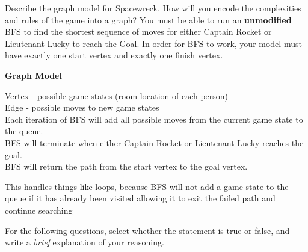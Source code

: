 \documentclass[12pt]{exam}
\newcommand{\stars}[1]{%
    \foreach \n in {1,...,#1}{%
        $\filledstar$%
    }%
}
\begin{document}
\begin{questions}

    \question[35] [Maze, \stars{5}] Describe the graph model for Spacewreck. How will you encode the complexities and rules of the game into a graph? You must be able to run an \textbf{unmodified} BFS to find the shortest sequence of moves for either Captain Rocket or Lieutenant Lucky to reach the Goal. In order for BFS to work, your model must have exactly one start vertex and exactly one finish vertex.


    \textbf{Graph Model}

    Vertex - possible game states (room location of each person)\\
    Edge - possible moves to new game states \\

    Each iteration of BFS will add all possible moves from the current game state to the queue. \\
    BFS will terminate when either Captain Rocket or Lieutenant Lucky reaches the goal. \\
    BFS will return the path from the start vertex to the goal vertex.


    This handles things like loops, because BFS will not add a game state to the queue if it has already been visited allowing it to exit the failed path and continue searching


    \clearpage

    \question[5] [W3, \stars{1}] For the following questions, select whether the statement is true or false,
    and write a \textit{brief} explanation of your reasoning.

\end{questions}
\end{document}
